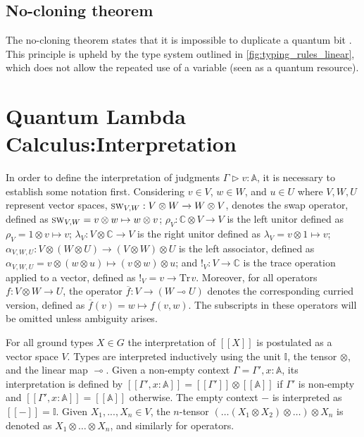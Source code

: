 


\subsection{No-cloning theorem}
The no-cloning theorem states that it is impossible to duplicate a quantum bit \cite{wootters1982single}. This principle is upheld by the type system outlined in \autoref{fig:typing_rules_linear}, which does not allow the repeated use of a variable (seen as a quantum resource).




\section{Quantum Lambda Calculus:Interpretation} \label{sec:Quantum Lambda Calculus:Interpretation}

In order to define the interpretation of judgments $\Gamma \triangleright v: \mathbb{A}$, it is necessary to establish some notation first. Considering $v \in V$, $w \in W$, and $u \in U$  where $V, W, U$ represent vector spaces,  $\textsc{sw}_{V,W} : V\otimes W \xrightarrow{} W \otimes V$, denotes the swap operator, defined as $\textsc{sw}_{V,W}= v\otimes w \mapsto w \otimes v$;    $\rho_{V} : \mathbb{C} \otimes V \xrightarrow{} V $ is the left unitor defined as $\rho_{V}= 1 \otimes v \mapsto v $; $\lambda_{V} : V  \otimes \mathbb{C} \xrightarrow{} V $ is the right unitor defined as $\lambda_{V}= v \otimes 1 \mapsto v$; $\alpha_{V,W,U} : V  \otimes (W \otimes U) \xrightarrow{} (V  \otimes W) \otimes U$ is the left associator, defined as $\alpha_{V,W,U}= v \otimes (w \otimes u) \mapsto (v \otimes w) \otimes u $; and $!_{V}: V \xrightarrow{} \mathbb{C}$ is the trace operation applied to a vector, defined as  $!_{V}= v \xrightarrow{} \text{Tr} \hspace{1pt}v$. Moreover, for all operators $f: V \otimes W \xrightarrow{} U$, the operator $\overline{f} : V \xrightarrow{} (W \multimap U)$ denotes the corresponding curried version, defined as $\overline{f}(v) = w \mapsto  f(v,w)$. The subscripts in these operators will be omitted unless ambiguity arises.

For all ground types $X \in G$  the interpretation of $[\![X]\!]$  is postulated as a vector space $V$. Types are interpreted inductively using the unit $\mathbb{I}$, the tensor $\otimes$, and the linear map $\multimap$. Given a non-empty context $\Gamma=\Gamma',x: \mathbb{A}$, its interpretation is defined by $[\![\Gamma',x: \mathbb{A}]\!] = [\![\Gamma']\!] \otimes [\![\mathbb{A}]\!]$ if $\Gamma'$ is non-empty and $[\![\Gamma',x: \mathbb{A}]\!] = [\![\mathbb{A}]\!]$ otherwise. The empty context $-$ is interpreted as $[\![-]\!] = \mathbb{I}$. Given $X_{1}, . . . ,X_{n} \in V$, the $n$-tensor $(\ldots (X_1 \otimes X_2) \otimes \ldots ) \otimes X_{n}$ is denoted as $X_1 \otimes \ldots \otimes X_{n}$, and similarly for operators. 


